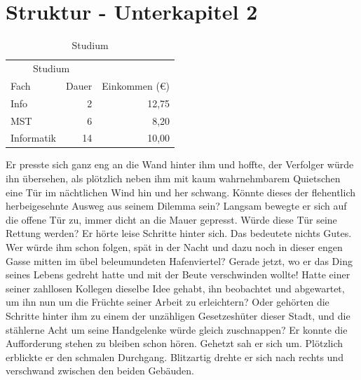 \section{Struktur - Unterkapitel 2}
\label{Struktur_-_Unterkapitel_2}
%
\begin{table}[b]
\centering
\begin{tabular}{lrr}
\toprule
\multicolumn{2}{c}{Studium}\\ \cmidrule{1-2}
Fach & Dauer & Einkommen (\euro{})\\
\midrule
Info & 2 & 12,75 \\ \addlinespace
MST & 6 & 8,20 \\ \addlinespace
Informatik & 14 & 10,00\\
\bottomrule
\end{tabular}
\caption{Studium}
\label{table:Studium}
\end{table}
%
Er presste sich ganz eng an die Wand hinter ihm und hoffte, der
Verfolger würde ihn übersehen, als plötzlich neben ihm mit kaum
wahrnehmbarem Quietschen eine Tür im nächtlichen Wind hin und her
schwang. Könnte dieses der flehentlich herbeigesehnte Ausweg aus
seinem Dilemma sein? Langsam bewegte er sich auf die offene Tür
zu, immer dicht an die Mauer gepresst. Würde diese Tür seine
Rettung werden? Er hörte leise Schritte hinter sich. Das bedeutete
nichts Gutes. Wer würde ihm schon folgen, spät in der Nacht und
dazu noch in dieser engen Gasse mitten im übel beleumundeten
Hafenviertel? Gerade jetzt, wo er das Ding seines Lebens gedreht
hatte und mit der Beute verschwinden wollte! Hatte einer seiner
zahllosen Kollegen dieselbe Idee gehabt, ihn beobachtet und
abgewartet, um ihn nun um die Früchte seiner Arbeit zu
erleichtern? Oder gehörten die Schritte hinter ihm zu einem der
unzähligen Gesetzeshüter dieser Stadt, und die stählerne Acht um
seine Handgelenke würde gleich zuschnappen? Er konnte die
Aufforderung stehen zu bleiben schon hören. Gehetzt sah er sich
um. Plötzlich erblickte er den schmalen Durchgang. Blitzartig
drehte er sich nach rechts und verschwand zwischen den beiden
Gebäuden.

